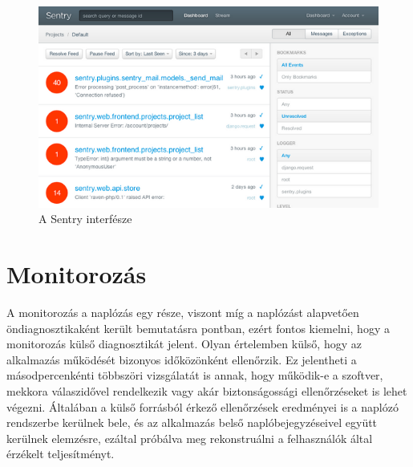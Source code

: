 \begin{figure}[H]
	\centering
		\includegraphics[scale=1]{assets/sentry.png}%
		\caption[DUMMY]%
		{A Sentry interfésze}%
		\label{fig:sentry}
\end{figure}

\section{Monitorozás}
A monitorozás a naplózás egy része, viszont míg a naplózást alapvetően öndiagnosztikaként került bemutatásra  pontban, ezért fontos kiemelni, hogy a monitorozás külső diagnosztikát jelent. Olyan értelemben külső, hogy az alkalmazás működését bizonyos időközönként ellenőrzik. Ez jelentheti a másodpercenkénti többszöri vizsgálatát is annak, hogy működik-e a szoftver, mekkora válaszidővel rendelkezik vagy akár biztonságossági ellenőrzéseket is lehet végezni. Általában a külső forrásból érkező ellenőrzések eredményei is a naplózó rendszerbe kerülnek bele, és az alkalmazás belső naplóbejegyzéseivel együtt kerülnek elemzésre, ezáltal próbálva meg rekonstruálni a felhasználók által érzékelt teljesítményt.

